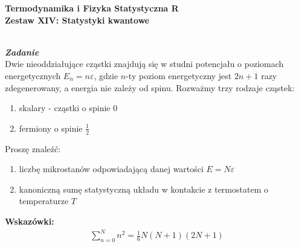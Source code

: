 \documentclass[11pt,a4paper]{article}
\newcounter{zadanie}\newcommand{\zadanie}[1][]{\addtocounter{zadanie}{1} ~\\ {\bf \emph{Zadanie \arabic{zadanie} #1 }} \\}
\begin{document}
   

\begin{centering}
  {\bf {\Large
  Termodynamika i Fizyka Statystyczna R \\
  Zestaw XIV: Statystyki kwantowe
    }} \\  
\end{centering}

\vspace{1cm}

\zadanie[]

Dwie nieoddziałujące cząstki znajdują się w studni potencjału o poziomach 
energetycznych $E_n = n\varepsilon$, gdzie $n$-ty poziom energetyczny jest 
$2n + 1$ razy zdegenerowany, a energia nie zależy od spinu. Rozważmy trzy 
rodzaje cząstek:

\begin{enumerate}[label=\roman*)]
\item skalary - cząstki o spinie $0$
\item fermiony o spinie $\frac{1}{2}$
\end{enumerate}

Proszę znaleźć:
\begin{enumerate}[label=\alph*)]
\item liczbę mikrostanów odpowiadającą danej wartości $E = N\varepsilon$
\item kanoniczną sumę statystyczną układu w kontakcie z termostatem o temperaturze $T$
\end{enumerate}

{\bf Wskazówki:} 
\begin{align*}
  \sum_{n=0}^{N} n^2 = \frac{1}{6}N(N+1)(2N+1)
\end{align*}
\end{document}
